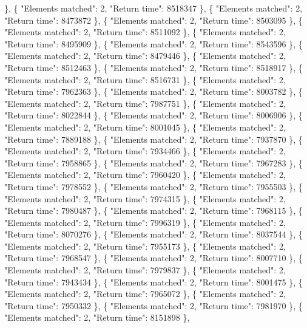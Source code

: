 \}, \{ "Elements matched": 2, "Return time": 8518347 \}, \{ "Elements matched": 2, "Return time": 8473872 \}, \{ "Elements matched": 2, "Return time": 8503095 \}, \{ "Elements matched": 2, "Return time": 8511092 \}, \{ "Elements matched": 2, "Return time": 8495909 \}, \{ "Elements matched": 2, "Return time": 8543596 \}, \{ "Elements matched": 2, "Return time": 8479446 \}, \{ "Elements matched": 2, "Return time": 8512463 \}, \{ "Elements matched": 2, "Return time": 8518917 \}, \{ "Elements matched": 2, "Return time": 8516731 \}, \{ "Elements matched": 2, "Return time": 7962363 \}, \{ "Elements matched": 2, "Return time": 8003782 \}, \{ "Elements matched": 2, "Return time": 7987751 \}, \{ "Elements matched": 2, "Return time": 8022844 \}, \{ "Elements matched": 2, "Return time": 8006906 \}, \{ "Elements matched": 2, "Return time": 8001045 \}, \{ "Elements matched": 2, "Return time": 7889188 \}, \{ "Elements matched": 2, "Return time": 7937870 \}, \{ "Elements matched": 2, "Return time": 7934466 \}, \{ "Elements matched": 2, "Return time": 7958865 \}, \{ "Elements matched": 2, "Return time": 7967283 \}, \{ "Elements matched": 2, "Return time": 7960420 \}, \{ "Elements matched": 2, "Return time": 7978552 \}, \{ "Elements matched": 2, "Return time": 7955503 \}, \{ "Elements matched": 2, "Return time": 7974315 \}, \{ "Elements matched": 2, "Return time": 7980487 \}, \{ "Elements matched": 2, "Return time": 7968115 \}, \{ "Elements matched": 2, "Return time": 7996319 \}, \{ "Elements matched": 2, "Return time": 8070276 \}, \{ "Elements matched": 2, "Return time": 8037544 \}, \{ "Elements matched": 2, "Return time": 7955173 \}, \{ "Elements matched": 2, "Return time": 7968547 \}, \{ "Elements matched": 2, "Return time": 8007710 \}, \{ "Elements matched": 2, "Return time": 7979837 \}, \{ "Elements matched": 2, "Return time": 7943434 \}, \{ "Elements matched": 2, "Return time": 8001475 \}, \{ "Elements matched": 2, "Return time": 7965072 \}, \{ "Elements matched": 2, "Return time": 7950332 \}, \{ "Elements matched": 2, "Return time": 7981970 \}, \{ "Elements matched": 2, "Return time": 8151898 \},

